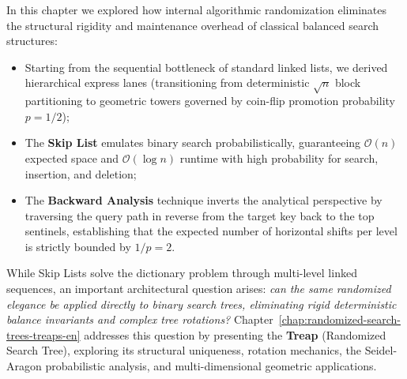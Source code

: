 In this chapter we explored how internal algorithmic randomization eliminates the structural rigidity and maintenance overhead of classical balanced search structures:
\begin{itemize}
  \item Starting from the sequential bottleneck of standard linked lists, we derived hierarchical express lanes (transitioning from deterministic $\sqrt{n}$ block partitioning to geometric towers governed by coin-flip promotion probability $p = 1/2$);
  \item The \textbf{Skip List} emulates binary search probabilistically, guaranteeing $\mathcal{O}(n)$ expected space and $\mathcal{O}(\log n)$ runtime with high probability for search, insertion, and deletion;
  \item The \textbf{Backward Analysis} technique inverts the analytical perspective by traversing the query path in reverse from the target key back to the top sentinels, establishing that the expected number of horizontal shifts per level is strictly bounded by $1/p = 2$.
\end{itemize}

While Skip Lists solve the dictionary problem through multi-level linked sequences, an important architectural question arises: \textit{can the same randomized elegance be applied directly to binary search trees, eliminating rigid deterministic balance invariants and complex tree rotations?}
Chapter~\ref{chap:randomized-search-trees-treaps-en} addresses this question by presenting the \textbf{Treap} (Randomized Search Tree), exploring its structural uniqueness, rotation mechanics, the Seidel-Aragon probabilistic analysis, and multi-dimensional geometric applications.

